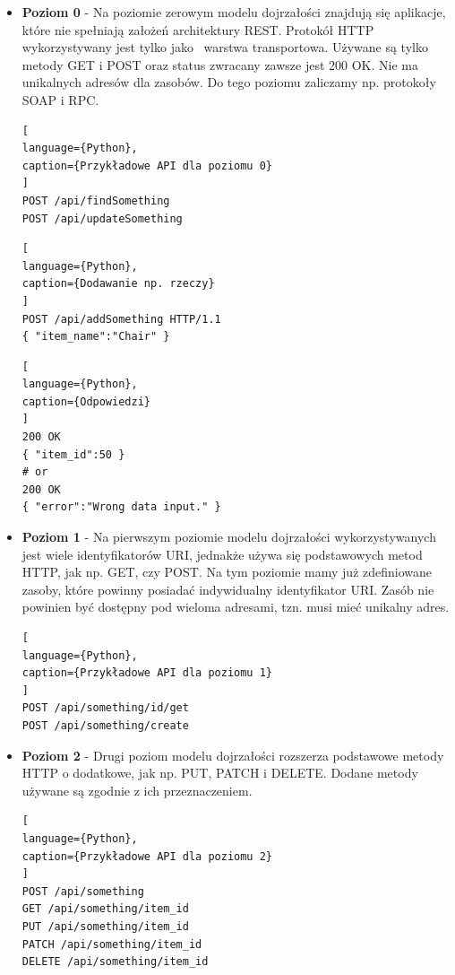 \documentclass[oneside,polski,logo,indent]{amuthesis}
\begin{document}
\begin{itemize}
\item \textbf{Poziom 0} - Na poziomie zerowym modelu dojrzałości znajdują się aplikacje, które nie spełniają założeń architektury REST. Protokół HTTP wykorzystywany jest tylko jako~ warstwa transportowa. Używane są tylko metody GET i POST oraz status zwracany zawsze jest 200 OK. Nie ma unikalnych adresów dla zasobów. Do tego poziomu zaliczamy np. protokoły SOAP i RPC.

\begin{lstlisting}[
language={Python},
caption={Przykładowe API dla poziomu 0}
]
POST /api/findSomething
POST /api/updateSomething
\end{lstlisting}

\begin{lstlisting}[
language={Python},
caption={Dodawanie np. rzeczy}
]
POST /api/addSomething HTTP/1.1
{ "item_name":"Chair" }
\end{lstlisting}

\newpage 
\begin{lstlisting}[
language={Python},
caption={Odpowiedzi}
]
200 OK
{ "item_id":50 }
# or
200 OK
{ "error":"Wrong data input." }
\end{lstlisting}

\item \textbf{Poziom 1} - Na pierwszym poziomie modelu dojrzałości wykorzystywanych jest wiele identyfikatorów URI, jednakże używa się podstawowych metod HTTP, jak np. GET, czy POST. Na tym poziomie mamy już zdefiniowane zasoby, które powinny posiadać indywidualny identyfikator URI. Zasób nie powinien być dostępny pod wieloma adresami, tzn. musi mieć unikalny adres.

\begin{lstlisting}[
language={Python},
caption={Przykładowe API dla poziomu 1}
]
POST /api/something/id/get
POST /api/something/create
\end{lstlisting}

\item \textbf{Poziom 2} - Drugi poziom modelu dojrzałości rozszerza podstawowe metody HTTP o dodatkowe, jak np. PUT, PATCH i DELETE. Dodane metody używane są zgodnie z ich przeznaczeniem.

\begin{lstlisting}[
language={Python},
caption={Przykładowe API dla poziomu 2}
]
POST /api/something
GET /api/something/item_id
PUT /api/something/item_id
PATCH /api/something/item_id
DELETE /api/something/item_id
\end{lstlisting}


\end{itemize}
\end{document}
